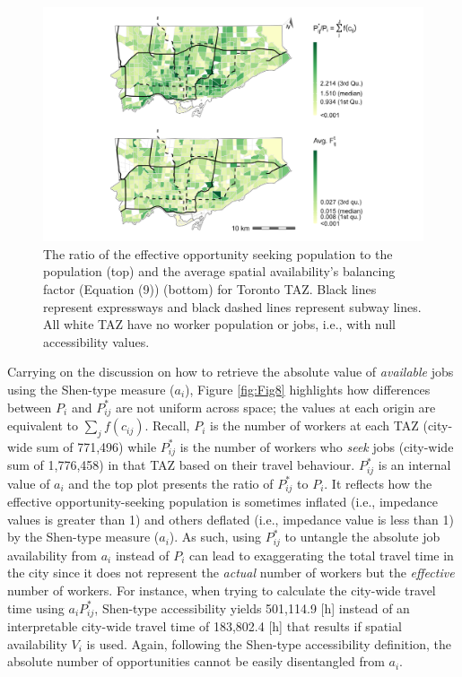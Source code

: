 \documentclass[10pt,letterpaper]{article}
\begin{document}
\begin{figure}
\includegraphics[width=1\linewidth]{images/Fig8} \caption{\label{fig:Fig8}  The ratio of the effective opportunity seeking population to the population (top) and the average spatial availability's balancing factor (Equation (9)) (bottom) for Toronto TAZ. Black lines represent expressways and black dashed lines represent subway lines. All white TAZ have no worker population or jobs, i.e., with null accessibility values.}\label{fig:internal-values-plot}
\end{figure}

Carrying on the discussion on how to retrieve the absolute value of
\emph{available} jobs using the Shen-type measure (\(a_i\)), Figure
\ref{fig:Fig8} highlights how differences between \(P_i\) and
\(P_{ij}^*\) are not uniform across space; the values at each origin are
equivalent to \(\sum_j f(c_{ij})\). Recall, \(P_i\) is the number of
workers at each TAZ (city-wide sum of 771,496) while \(P_{ij}^*\) is the
number of workers who \emph{seek} jobs (city-wide sum of 1,776,458) in
that TAZ based on their travel behaviour. \(P_{ij}^*\) is an internal
value of \(a_i\) and the top plot presents the ratio of \(P_{ij}^*\) to
\(P_i\). It reflects how the effective opportunity-seeking population is
sometimes inflated (i.e., impedance values is greater than 1) and others
deflated (i.e., impedance value is less than 1) by the Shen-type measure
(\(a_i\)). As such, using \(P_{ij}^*\) to untangle the absolute job
availability from \(a_i\) instead of \(P_i\) can lead to exaggerating
the total travel time in the city since it does not represent the
\emph{actual} number of workers but the \emph{effective} number of
workers. For instance, when trying to calculate the city-wide travel
time using \(a_i P_{ij}^*\), Shen-type accessibility yields 501,114.9
{[}h{]} instead of an interpretable city-wide travel time of 183,802.4
{[}h{]} that results if spatial availability \(V_i\) is used. Again,
following the Shen-type accessibility definition, the absolute number of
opportunities cannot be easily disentangled from \(a_i\).
\end{document}
